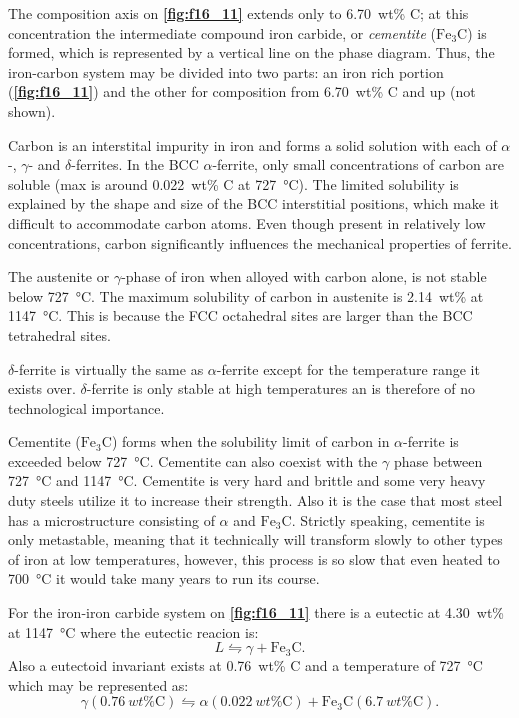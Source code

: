 The composition axis on \textbf{\autoref{fig:f16_11}} extends only to \qty{6,70}{wt}\% C; at this concentration the intermediate compound iron carbide, or \textit{cementite} ($\mathrm{Fe}_3 \mathrm{C}$) is formed, which is represented by a vertical line on the phase diagram. Thus, the iron-carbon system may be divided into two parts: an iron rich portion (\textbf{\autoref{fig:f16_11}}) and the other for composition from \qty{6,70}{wt}\% C and up (not shown).

Carbon is an interstital impurity in iron and forms a solid solution with each of $\alpha$-, $\gamma$- and $\delta$-ferrites. In the BCC $\alpha$-ferrite, only small concentrations of carbon are soluble (max is around \qty{0,022}{wt}\% C at \qty{727}{\celsius}). The limited solubility is explained by the shape and size of the BCC interstitial positions, which make it difficult to accommodate carbon atoms. Even though present in relatively low concentrations, carbon significantly influences the mechanical properties of ferrite. 

The austenite or $\gamma$-phase of iron when alloyed with carbon alone, is not stable below \qty{727}{\celsius}. The maximum solubility of carbon in austenite is \qty{2,14}{wt}\% at \qty{1147}{\celsius}. This is because the FCC octahedral sites are larger than the BCC tetrahedral sites. 

$\delta$-ferrite is virtually the same as $\alpha$-ferrite except for the temperature range it exists over. $\delta$-ferrite is only stable at high temperatures an is therefore of no technological importance.

Cementite ($\mathrm{Fe}_3 \mathrm{C}$) forms when the solubility limit of carbon in $\alpha$-ferrite is exceeded below \qty{727}{\celsius}. Cementite can also coexist with the $\gamma$ phase between \qty{727}{\celsius} and \qty{1147}{\celsius}. Cementite is very hard and brittle and some very heavy duty steels utilize it to increase their strength. Also it is the case that most steel has a microstructure consisting of $\alpha$ and $\mathrm{Fe}_3 \mathrm{C}$. Strictly speaking, cementite is only metastable, meaning that it technically will transform slowly to other types of iron at low temperatures, however, this process is so slow that even heated to \qty{700}{\celsius}  it would take many years to run its course. 

For the iron-iron carbide system on \textbf{\autoref{fig:f16_11}} there is a eutectic at \qty{4,30}{wt}\% at \qty{1147}{\celsius} where the eutectic reacion is:
\[ 
L \leftrightharpoons \gamma + \mathrm{Fe}_3 \mathrm{C}
.\]
Also a eutectoid invariant exists at \qty{0,76}{wt}\% C and a temperature of \qty{727}{\celsius} which may be represented as:
\[ 
\gamma(\qty{0,76}{wt}\% \text{C}) \leftrightharpoons \alpha \left( \qty{0,022}{wt}\% \text{C} \right) + \mathrm{Fe}_3 \mathrm{C} \left( \qty{6,7}{wt}\% \text{C} \right) 
.\]


